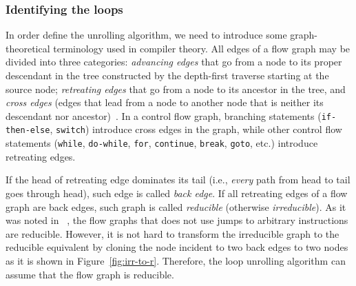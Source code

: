 \subsubsection{Identifying the loops}

In order define the unrolling algorithm, we need to introduce some graph-theoretical terminology used in compiler theory.
All edges of a flow graph may be divided into three categories: \textit{advancing edges} that go from a node to its proper descendant in the tree constructed by the depth-first traverse starting at the source node; \textit{retreating edges} that go from a node to its ancestor in the tree, and \textit{cross edges} (edges that lead from a node to another node that is neither its descendant nor ancestor)~\cite{aho2007compilers::loop_unrolling}.
In a control flow graph, branching statements (\texttt{if-then-else}, \texttt{switch}) introduce cross edges in the graph, while other control flow statements (\texttt{while}, \texttt{do-while}, \texttt{for}, \texttt{continue}, \texttt{break}, \texttt{goto}, etc.) introduce retreating edges.

If the head of retreating edge dominates its tail (i.e., \textit{every} path from head to tail goes through head), such edge is called \textit{back edge}. If all retreating edges of a flow graph are back edges, such graph is called \textit{reducible} (otherwise \textit{irreducible}). As it was noted in ~\cite{aho2007compilers::loop_unrolling}, the flow graphs that does not use jumps to arbitrary instructions are reducible. However, it is not hard to transform the irreducible graph to the reducible equivalent by cloning the node incident to two back edges to two nodes as it is shown in Figure~\ref{fig:irr-to-r}. Therefore, the loop unrolling algorithm can assume that the flow graph is reducible.

